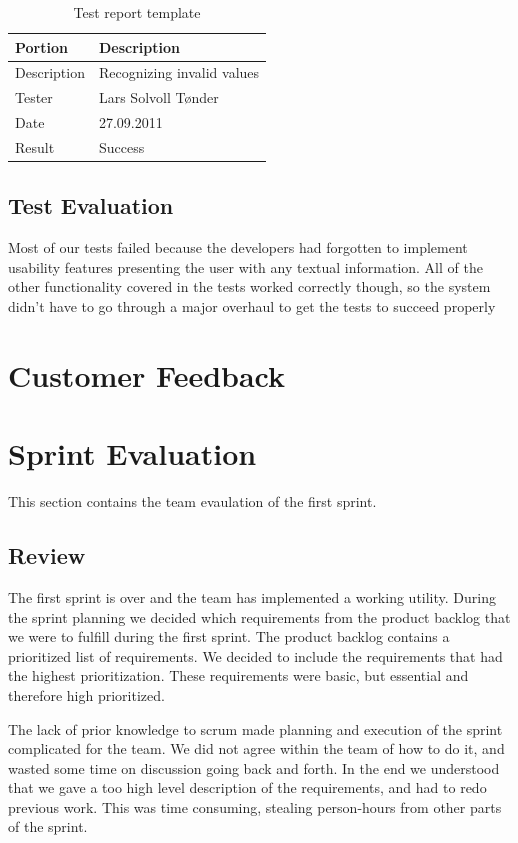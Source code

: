 \begin{table}[ht] \small \center
\caption{Test report template \label{tab:testreport}}
\begin{tabular}{l l}
	\toprule
	Portion & Description \\
	\midrule
	Description &  Recognizing invalid values  \\
	Tester & Lars Solvoll Tønder \\
	Date & 27.09.2011 \\
	Result & Success\\
	\bottomrule
\end{tabular}
\end{table}

\subsection{Test Evaluation}
Most of our tests failed because the developers had forgotten to implement usability features presenting the user with any textual information. All of the other functionality covered in the tests worked correctly though, so the system didn't have to go through a major overhaul to get the tests to succeed properly

\section{Customer Feedback}

\section{Sprint Evaluation}
This section contains the team evaulation of the first sprint.
\subsection{Review}
The first sprint is over and the team has implemented a working utility. During the sprint planning we decided which requirements from the product backlog that we were to fulfill during the first sprint. The product backlog contains a prioritized list of requirements. We decided to include the requirements that had the highest prioritization. These requirements were basic, but essential and therefore high prioritized.
   
The lack of prior knowledge to scrum made planning and execution of the sprint complicated for the team. We did not agree within the team of how to do it, and wasted some time on discussion going back and forth. In the end we understood that we gave a too high level description of the requirements, and had to redo previous work. This was time consuming, stealing person-hours from other parts of the sprint.

